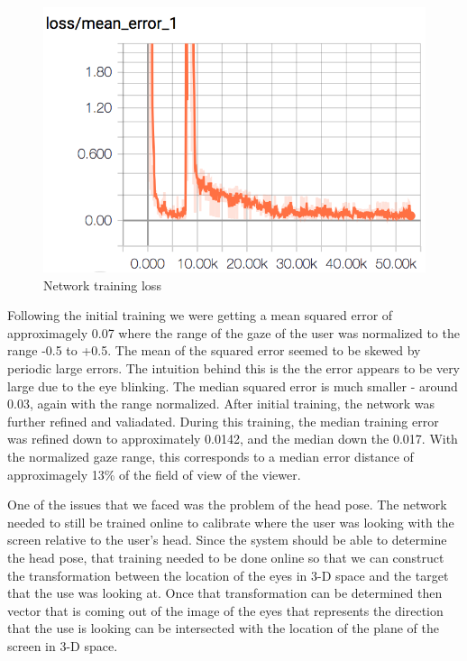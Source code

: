 \documentclass[10pt,twocolumn,letterpaper]{article}
\begin{document}
\begin{figure}[!h]
  \begin{center}
    \includegraphics[width=\linewidth]{tb-gross-training-mse-loss.png}
    \caption{Network training loss}
    \label{fig:train-loss}
  \end{center}
\end{figure}

Following the initial training we were getting a mean squared error of
approximagely 0.07 where the range of the gaze of the user was
normalized to the range -0.5 to +0.5. The mean of the squared error
seemed to be skewed by periodic large errors. The intuition behind
this is the the error appears to be very large due to the eye
blinking. The median squared error is much smaller - around 0.03,
again with the range normalized. After initial training, the network
was further refined and valiadated. During this training, the median
training error was refined down to approximately 0.0142, and the
median down the 0.017. With the normalized gaze range, this
corresponds to a median error distance of approximagely 13\% of the
field of view of the viewer.

One of the issues that we faced was the problem of the head pose.
The network needed to still be trained online to calibrate where
the user was looking with the screen relative to the user's head.
Since the system should be able to determine the head pose,
that training needed to be done online so that we can construct the
transformation between the location of the eyes in 3-D space and the
target that the use was looking at. Once that transformation can be
determined then vector that is coming out of the image of the eyes
that represents the direction that the use is looking can be
intersected with the location of the plane of the screen in 3-D
space.
\end{document}

